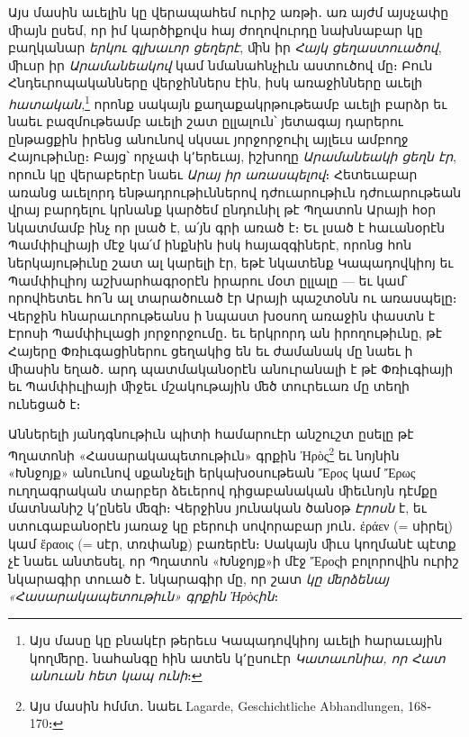 \documentclass{article}
\begin{document}
{Այս մասին աւելին կը վերապահեմ ուրիշ առթի․ առ այժմ այսչափը ﬕայն ըսեմ, որ իմ կարծիքովս հայ ժողովուրդը նախնաբար կը բաղկանար \emph{երկու գլխաւոր ցեղերէ}, ﬕն իր \emph{Հայկ ցեղաստուածով}, ﬕւսր իր \emph{Արամանեակով} կամ նմանահնչիւն աստուծով մը։ Բուն Հնդեւրոպականները վերջիններս էին, իսկ առաջինները աւելի \emph{հատական},\footnote{Այս մասը կը բնակէր թերեւս Կապադովկիոյ աւելի հարաւային կողﬔրը․ նահանգը հին ատեն կ՚ըսուէր \emph{Կատաւոնիա, որ Հատ անուան հետ կապ ունի}։} որոնք սակայն քաղաքակրթութեամբ աւելի բարձր եւ նաեւ բազմութեամբ աւելի շատ ըլլալուն՝ յետագայ դարերու ընթացքին իրենց անունով սկսաւ յորջորջուիլ այլեւս ամբողջ Հայութիւնը։ Բայց՝ որչափ կ՚երեւայ, իշխողը \emph{Արամանեակի ցեղն էր}, որուն կը վերաբերէր նաեւ \emph{Արայ իր առասպելով}։ Հետեւաբար առանց աւելորդ ենթադրութիւններով դժուարութիւն դժուարութեան վրայ բարդելու կրնանք կարծեմ ընդունիլ թէ Պղատոն Արայի հօր նկատմամբ ինչ որ լսած է, ա՛յն գրի առած է։ Եւ լսած է հաւանօրէն Պամփիւլիայի մէջ կա՛մ ինքնին իսկ հայազգիներէ, որոնց հոն ներկայութիւնը շատ ալ կարելի էր, եթէ նկատենք Կապադովկիոյ եւ Պամփիւլիոյ աշխարհագրօրէն իրարու մօտ ըլլալը — եւ կամ՝ որովհետեւ հո՛ն ալ տարածուած էր Արայի պաշտօնն ու առասպելը։ Վերջին հնարաւորութեանս ի նպաստ խօսող առաջին փաստն է Էրոսի Պամփիւլացի յորջորջումը․ եւ երկրորդ ան իրողութիւնը, թէ Հայերը Փռիւգացիներու ցեղակից են եւ ժամանակ մը նաեւ ի ﬕասին եղած․ արդ պատմականօրէն անուրանալի է թէ Փռիւգիայի եւ Պամփիւլիայի ﬕջեւ մշակութային ﬔծ տուրեւառ մը տեղի ունեցած է։

Աններելի յանդգնութիւն պիտի համարուէր անշուշտ ըսելը թէ Պղատոնի «Հասարակապետութիւն» գրքին Ἠρὸς\footnote{Այս մասին հմմտ․ նաեւ Lagarde, Geschichtliche Abhandlungen, 168֊170։} եւ նոյնին «Խնջոյք» անունով սքանչելի երկախօսութեան Ἔρος կամ Ἔρως ուղղագրական տարբեր ձեւերով դիցաբանական ﬕեւնոյն դէմքը մատնանիշ կ՚ընեն ﬔզի։ Վերջինս յունական ծանօթ \emph{Էրոսն} է, եւ ստուգաբանօրէն յառաջ կը բերուի սովորաբար յուն․ ἐράεν (= սիրել) կամ ἔραοις (= սէր, տռփանք) բառերէն։ Սակայն ﬕւս կողմանէ պէտք չէ նաեւ անտեսել, որ Պղատոն «Խնջոյք»ի մէջ Ἔροςի բոլորովին ուրիշ նկարագիր տուած է․ նկարագիր մը, որ շատ \emph{կը ﬔրձենայ «Հասարակապետութիւն» գրքին Ἠρὸςին}։

}
\end{document}
